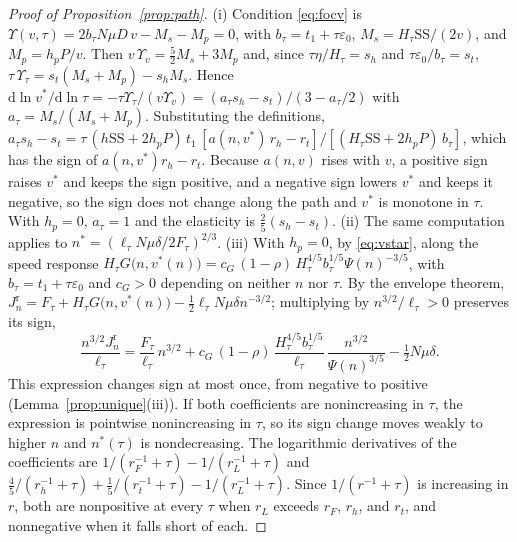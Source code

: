 \documentclass[11pt]{article}
\numberwithin{proposition}{section}
\theoremstyle{definition}
\theoremstyle{remark}
\theoremstyle{plain}
\newcommand{\sstock}{\mathrm{SS}}
\begin{document}
\begin{proof}[Proof of Proposition~\ref{prop:path}]
(i) Condition \eqref{eq:focv} is $\Upsilon(v,\tau)=2b_\tau N\mu D\,v-M_s-M_p=0$, with $b_\tau=t_1+\tau\varepsilon_0$,
$M_s=H_\tau\sstock/(2v)$, and $M_p=h_pP/v$. Then $v\,\Upsilon_v=\tfrac52M_s+3M_p$ and, since
$\tau\eta/H_\tau=s_h$ and $\tau\varepsilon_0/b_\tau=s_t$, $\tau\,\Upsilon_\tau=s_t(M_s+M_p)-s_hM_s$. Hence
$\mathrm d\ln v^*/\mathrm d\ln\tau=-\tau\Upsilon_\tau/(v\Upsilon_v)=(a_\tau s_h-s_t)/(3-a_\tau/2)$ with $a_\tau=M_s/(M_s+M_p)$.
Substituting the definitions, $a_\tau s_h-s_t=\tau\,(h\sstock+2h_pP)\,t_1\,[a(n,v^*)\,r_h-r_t]/
[(H_\tau\sstock+2h_pP)\,b_\tau]$, which has the sign of $a(n,v^*)r_h-r_t$. Because $a(n,v)$ rises with $v$, a
positive sign raises $v^*$ and keeps the sign positive, and a negative sign lowers $v^*$ and keeps it negative, so
the sign does not change along the path and $v^*$ is monotone in $\tau$. With $h_p=0$, $a_\tau=1$ and the
elasticity is $\tfrac25(s_h-s_t)$. (ii) The same computation
applies to $n^*=(\ell_\tau N\mu\delta/2F_\tau)^{2/3}$. (iii) With $h_p=0$, by \eqref{eq:vstar}, along the speed response
$H_\tau G\big(n,v^*(n)\big)=c_G\,(1-\rho)\,H_\tau^{4/5}b_\tau^{1/5}\Psi(n)^{-3/5}$, with $b_\tau=t_1+\tau\varepsilon_0$
and $c_G>0$ depending on neither $n$ nor $\tau$. By the envelope theorem, $J^{\mathrm r}_n=F_\tau+H_\tau G\big(n,v^*(n)\big)-\tfrac12\ell_\tau N\mu\delta n^{-3/2}$;
multiplying by $n^{3/2}/\ell_\tau>0$ preserves its sign,
\[
  \frac{n^{3/2}J^{\mathrm r}_n}{\ell_\tau}=\frac{F_\tau}{\ell_\tau}\,n^{3/2}
  +c_G\,(1-\rho)\,\frac{H_\tau^{4/5}b_\tau^{1/5}}{\ell_\tau}\,\frac{n^{3/2}}{\Psi(n)^{3/5}}-\tfrac12N\mu\delta .
\]
This expression changes sign at most once, from negative to positive (Lemma~\ref{prop:unique}(iii)). If
both coefficients are nonincreasing in $\tau$, the expression is pointwise nonincreasing in $\tau$, so its sign
change moves weakly to higher $n$ and $n^*(\tau)$ is nondecreasing. The logarithmic derivatives of
the coefficients are $1/(r_F^{-1}+\tau)-1/(r_L^{-1}+\tau)$ and
$\tfrac45/(r_h^{-1}+\tau)+\tfrac15/(r_t^{-1}+\tau)-1/(r_L^{-1}+\tau)$. Since $1/(r^{-1}+\tau)$ is increasing in
$r$, both are nonpositive at every $\tau$ when $r_L$ exceeds $r_F$, $r_h$, and $r_t$, and nonnegative when it
falls short of each.


\end{proof}
\end{document}
